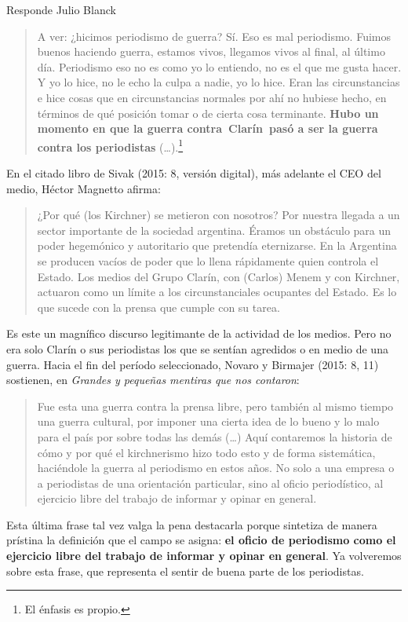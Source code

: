 Responde Julio Blanck

\begin{quote}
	A ver: ¿hicimos periodismo de guerra? Sí. Eso es mal periodismo. Fuimos buenos haciendo guerra, estamos vivos, llegamos vivos al final, al último día. Periodismo eso no es como yo lo entiendo, no es el que me gusta hacer. Y yo lo hice, no le echo la culpa a nadie, yo lo hice. Eran las circunstancias e hice cosas que en circunstancias normales por ahí no hubiese hecho, en términos de qué posición tomar o de cierta cosa terminante. \textbf{Hubo un momento en que la guerra contra~Clarín~pasó a ser la guerra contra los periodistas} (\dots).\footnote{El énfasis es propio.}
\end{quote}


En el citado libro de Sivak (2015: 8, versión digital), más adelante el CEO del medio, Héctor Magnetto afirma:

\begin{quote}
	¿Por qué (los Kirchner) se metieron con nosotros? Por nuestra llegada a un sector importante de la sociedad argentina. Éramos un obstáculo para un poder hegemónico y autoritario que pretendía eternizarse. En la Argentina se producen vacíos de poder que lo llena rápidamente quien controla el Estado. Los medios del Grupo Clarín, con (Carlos) Menem y con Kirchner, actuaron como un límite a los circunstanciales ocupantes del Estado. Es lo que sucede con la prensa que cumple con su tarea.
\end{quote}


Es este un magnífico discurso legitimante de la actividad de los medios. Pero no era solo Clarín o sus periodistas los que se sentían agredidos o en medio de una guerra. Hacia el fin del período seleccionado, Novaro y Birmajer (2015: 8, 11) sostienen, en \emph{Grandes y pequeñas mentiras que nos contaron}:

\begin{quote}
	Fue esta una guerra contra la prensa libre, pero también al mismo tiempo una guerra cultural, por imponer una cierta idea de lo bueno y lo malo para el país por sobre todas las demás (\dots) Aquí contaremos la historia de cómo y por qué el kirchnerismo hizo todo esto y de forma sistemática, haciéndole la guerra al periodismo en estos años. No solo a una empresa o a periodistas de una orientación particular, sino al oficio periodístico, al ejercicio libre del trabajo de informar y opinar en general.
\end{quote}


Esta última frase tal vez valga la pena destacarla porque sintetiza de manera prístina la definición que el campo se asigna: \textbf{el oficio de periodismo como el ejercicio libre del trabajo de informar y opinar en general}. Ya volveremos sobre esta frase, que representa el sentir de buena parte de los periodistas.

